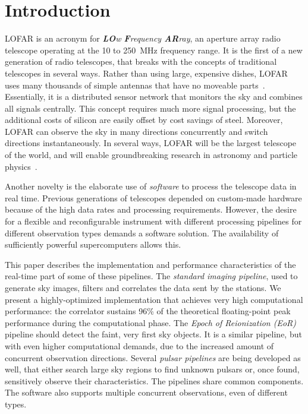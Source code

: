 \documentclass{sig-alternate}
\begin{document}
\section{Introduction}
LOFAR is an acronym for \emph{\textbf{LO}w \textbf{F}requency \textbf{AR}ray},
an aperture array radio telescope operating at the 10 to 250~MHz frequency
range.
It is the first of a new generation of radio telescopes, that breaks with
the concepts of traditional telescopes in several ways.
Rather than using large, expensive dishes, LOFAR uses many thousands of
simple antennas that have no moveable parts~\cite{Butcher:04,deVos:09}.
Essentially, it is a distributed sensor network that monitors the sky
and combines all signals centrally.
This concept requires much more signal processing, but the additional costs
of silicon are easily offset by cost savings of steel.
Moreover, LOFAR can observe the sky in many directions concurrently and
switch directions instantaneously.
In several ways, LOFAR will be the largest telescope of the world, and will
enable groundbreaking research in astronomy and particle
physics~\cite{Bruyn:02}.

Another novelty is the elaborate use of \emph{software\/} to process
the telescope data in real time.
Previous generations of telescopes depended on custom-made hardware
because of the high data rates and processing requirements.
However, the desire for a flexible and reconfigurable instrument with
different processing pipelines for different observation types demands a
software solution.
The availability of sufficiently powerful supercomputers allows this.

This paper describes the implementation and performance characteristics of
the real-time part of some of these pipelines.
The \emph{standard imaging pipeline}, used to generate sky images,
filters and correlates the data sent by the stations.
We present a highly-optimized implementation that achieves very high
computational performance: the correlator sustains 96\% of the theoretical
floating-point peak performance during the computational phase.
The \emph{Epoch of Reionization (EoR)\/} pipeline should detect the faint,
very first sky objects.
It is a similar pipeline, but with even higher computational demands, due to
the increased amount of concurrent observation directions.
Several \emph{pulsar pipelines\/} are being developed as well, that either
search large sky regions to find unknown pulsars or, once found, sensitively
observe their characteristics.
The pipelines share common components.
The software also supports multiple concurrent observations, even of different
types.
\end{document}
